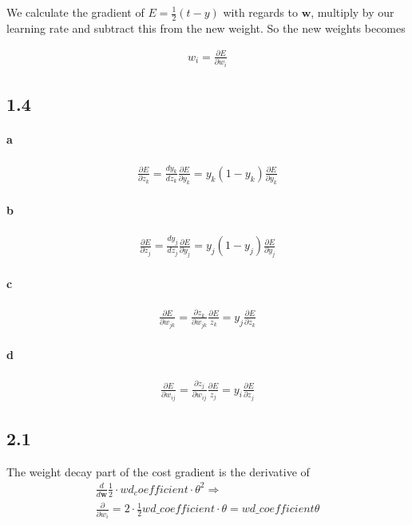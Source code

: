 \documentclass{article}
\begin{document}
We calculate the gradient of $E = \frac{1}{2} \left(t - y \right)$ with regards
to $\mathbf{w}$, multiply by our learning rate and subtract this from the new
weight. So the new weights becomes

\begin{align}
  w_i = \frac{\partial E}{\partial w_i}
\end{align}

\subsection*{1.4}

\paragraph{a}

\begin{align}
  \frac{\partial E}{\partial z_k} = \frac{dy_k}{dz_k} \frac{\partial E}{\partial y_k} =
  y_k \left( 1 - y_k \right) \frac{\partial E}{\partial y_k}
\end{align}

\paragraph{b}

\begin{align}
  \frac{\partial E}{\partial z_j} = \frac{dy_j}{dz_j} \frac{\partial E}{\partial y_j} =
  y_j \left( 1 - y_j \right) \frac{\partial E}{\partial y_j}
\end{align}

\paragraph{c}

\begin{align}
  \frac{\partial E}{\partial w_{jk}} = \frac{\partial z_k}{\partial w_{jk}} \frac{\partial E}{z_k} =
  y_j \frac{\partial E}{\partial z_k}
\end{align}

\paragraph{d}

\begin{align}
  \frac{\partial E}{\partial w_{ij}} = \frac{\partial z_j}{\partial w_{ij}} \frac{\partial E}{z_j} =
  y_i \frac{\partial E}{\partial z_j}
\end{align}

\subsection*{2.1}

The weight decay part of the cost gradient is the derivative of
\begin{align}
  \frac{d}{d\mathbf{w}}\frac{1}{2}\cdot wd_coefficient \cdot \theta^2 \Rightarrow \\
  \nonumber \frac{\partial}{\partial w_i} = 2 \cdot \frac{1}{2} wd\_coefficient \cdot \theta = wd\_coefficient \theta
\end{align}
\end{document}

